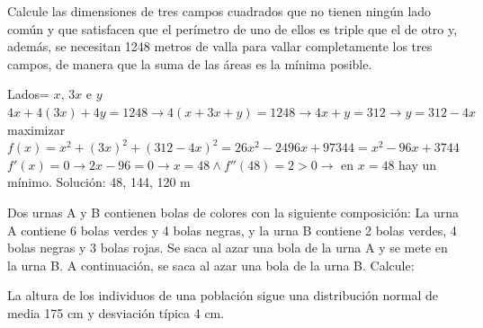 \documentclass[addpoints,spanish, 12pt,a4paper]{exam}
\begin{document}
\begin{questions}

\question[3] Calcule las dimensiones de tres campos cuadrados que no tienen ningún lado común y que
satisfacen que el perímetro de uno de ellos es triple que el de otro y, además, se necesitan 1248 metros de
valla para vallar completamente los tres campos, de manera que la suma de las áreas es la mínima posible.
\begin{solution}
    Lados= $x$, $3x$ e $y$ \\
    $4x+4(3x)+4y=1248 \to 4(x+3x+y)=1248 \to 4x+y=312 \to y=312-4x$ \\
    maximizar $f(x)=x^2+(3x)^2+(312-4x)^2=26 x^{2} - 2496 x + 97344= x^{2} - 96 x + 3744$ \\
    $f'(x)=0 \to 2x-96=0 \to x=48 \land f''(48)=2>0 \to$ en $x=48$ hay un mínimo.
    Solución: 48, 144, 120 m  
    
\end{solution}

\question Dos urnas A y B contienen bolas de colores con la siguiente composición: La urna
A contiene 6 bolas verdes y 4 bolas negras, y la urna B contiene 2 bolas verdes, 4
bolas negras y 3 bolas rojas. Se saca al azar una bola de la urna A y se mete en la
urna B. A continuación, se saca al azar una bola de la urna B. Calcule:


\question La altura de los individuos de una población sigue una distribución normal de media
175 cm y desviación típica 4 cm.
\begin{parts}

\end{parts}
\end{questions}
\end{document}

